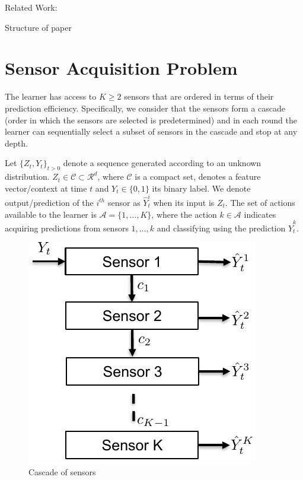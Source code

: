 \documentclass{article}
\begin{document}
Related Work: \cite{AISTATS13_SupervisedSequentialLearning_TrapezSaligram}\cite{ICML14_PredictionWithLimitedAdvice_LattimoreCrammerCzepes}

Structure of paper

\section{Sensor Acquisition Problem}
\label{sec:Setup}
The learner has access to $K\geq 2$ sensors that are ordered in terms of their prediction efficiency. Specifically, we consider that the sensors form a cascade (order in which the sensors are selected is predetermined) and in each round the learner can sequentially select a subset of sensors in the cascade and stop at any depth.  

Let $\{Z_t, Y_t\}_{{t>0}}$ denote a sequence generated according to an unknown distribution. $Z_t \in\mathcal{C} \subset  \mathcal{R}^d$, where $\mathcal{C}$ is a compact set, denotes a feature vector/context at time $t$ and $Y_t \in \{0,1\}$ its binary label. We denote output/prediction of the $i^{th}$ sensor as $\hat{Y}^i_t$ when its input is $Z_t$. The set of actions available to the learner is $\mathcal{A}=\{1,\ldots, K\}$, where  the action $k \in \mathcal{A}$ indicates acquiring predictions from sensors $1,\ldots, k$ and classifying using the prediction $\hat{Y}^k_t$. 


\begin{figure}
	\vspace{-.5cm}
	\centering
	\includegraphics[scale=.6]{SensorCascade.pdf}
	\caption{Cascade of sensors}\label{wrap-fig:1}
    \vspace{-.5cm}
\end{figure} 
\end{document}
